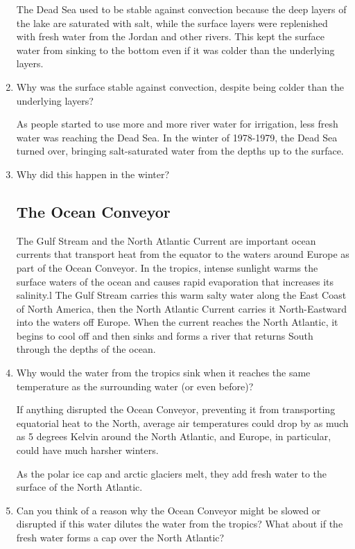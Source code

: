 \documentclass[12pt]{article}
\begin{document}
\begin{enumerate}
The Dead Sea used to be stable against convection because the deep layers of the lake are saturated with salt, while the surface layers were replenished with fresh water from the Jordan and other rivers.  This kept the surface water from sinking to the bottom even if it was colder than the underlying layers.

\item Why was the surface stable against convection, despite being colder than
the underlying layers?

As people started to use more and more river water for irrigation, less fresh water was reaching the Dead Sea.  In the winter of 1978-1979, the Dead Sea turned over, bringing salt-saturated water from the depths up to the surface.  

\item Why did this happen in the winter?


\subsection{The Ocean Conveyor}


The Gulf Stream and the North Atlantic Current are important ocean currents that transport heat from the equator to the waters around Europe as part of the Ocean Conveyor.  In the tropics, intense sunlight warms the surface waters of the ocean and causes rapid evaporation that increases its salinity.l  The Gulf Stream carries this warm salty water along the East Coast of North America, then the North Atlantic Current carries it North-Eastward into the waters off Europe.  When the current reaches the North Atlantic, it begins to cool off and then sinks and forms a river that returns South through the depths of the ocean.

\item Why would the water from the tropics sink when it reaches the same temperature as the surrounding water (or even before)?

If anything disrupted the Ocean Conveyor, preventing it from transporting equatorial heat to the North, average air temperatures could drop by as much as 5 degrees Kelvin around the North Atlantic, and Europe, in particular, could have much harsher winters.

As the polar ice cap and arctic glaciers melt, they add fresh water to the surface of the North Atlantic.  

\item Can you think of a reason why the Ocean Conveyor might be slowed or disrupted if this water dilutes the water from the tropics?  What about if the fresh water forms a cap over the North Atlantic?
\vspace{.1in}
\vspace{.1in}

\end{enumerate}
\end{document}
